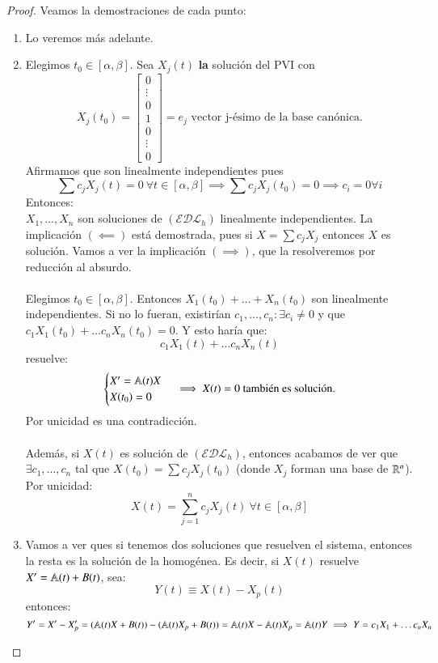 \begin{proof}
    Veamos la demostraciones de cada punto:\\
    \begin{enumerate}
        \item Lo veremos más adelante.
        \item Elegimos $t_0 \in [\alpha, \beta]$. Sea $X_j(t)$ \textbf{la} solución del PVI con
        $$
            X_j(t_0) = \left[\begin{matrix}
                0\\
                \vdots\\
                0\\
                1\\
                0\\
                \vdots\\
                0
        \end{matrix}\right] = e_j \text{ vector j-ésimo de la base canónica.}
        $$
        Afirmamos que son linealmente independientes pues
        $$
            \sum c_j X_j(t) = 0\ \forall t \in [\alpha, \beta] \implies \sum c_jX_j(t_0) = 0 \implies c_i = 0 \forall i
        $$
        Entonces:\\
        $X_1, \ldots, X_n$ son soluciones de $(\mathcal{EDL}_h)$ linealmente independientes. La implicación $(\impliedby)$ está demostrada, pues si $X = \sum c_j X_j$ entonces $X$ es solución. Vamos a ver la implicación $(\implies)$, que la resolveremos por reducción al absurdo.\\\\
        Elegimos $t_0 \in [\alpha, \beta]$. Entonces $X_1(t_0) + \ldots + X_n(t_0)$ son linealmente independientes. Si no lo fueran, existirían $c_1, \ldots, c_n : \exists c_i \neq 0$ y que $c_1X_1(t_0) + \ldots c_n X_n(t_0) = 0$. Y esto haría que:
        $$
            c_1X_1(t) + \ldots c_nX_n(t)
        $$ resuelve:
        $$
        \begin{cases}
            X' = \mathbb{A}(t)X\\
            X(t_0) = 0
        \end{cases} \implies X(t) = 0 \text{ también es solución.}
        $$
        Por unicidad es una contradicción.\\\\
        Además, si $X(t)$ es solución de $(\mathcal{EDL}_h)$, entonces acabamos de ver que $\exists c_1, \ldots, c_n$ tal que $X(t_0) = \sum c_jX_j(t_0)$ (donde $X_j$ forman una base de $\mathbb{R}^n$). Por unicidad:
        $$
            X(t) = \sum_{j=1}^n c_jX_j(t)\ \forall t\in[\alpha, \beta]
        $$
        \item Vamos a ver ques si tenemos dos soluciones que resuelven el sistema, entonces la resta es la solución de la homogénea. Es decir, si $X(t)$ resuelve $X' = \mathbb{A}(t) + B(t)$, sea:
        $$
            Y(t) \equiv X(t) - X_p(t)
        $$
        entonces:
        $$
            Y' = X' - X_p' = (\mathbb{A}(t)X + B(t)) - (\mathbb{A}(t)X_p + B(t)) = \mathbb{A}(t)X - \mathbb{A}(t)X_p = \mathbb{A}(t)Y \implies
            Y = c_1X_1 + \ldots c_nX_n
        $$
    \end{enumerate}
\end{proof}
